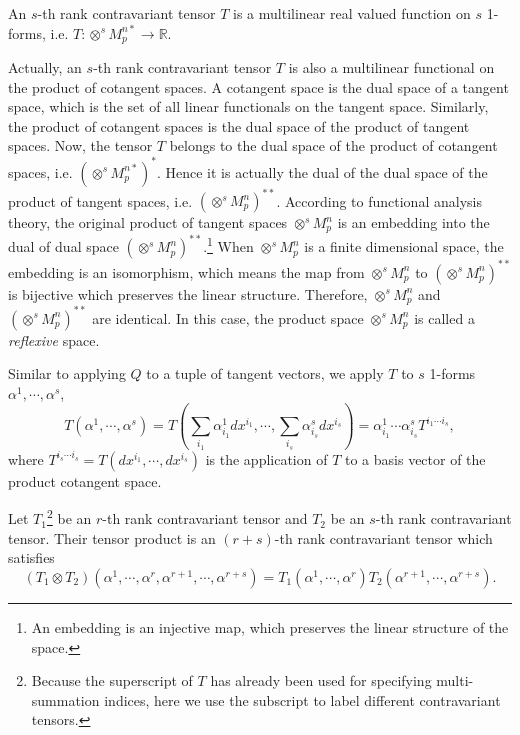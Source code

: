 \documentclass[11pt, a4paper]{book}
\begin{document}
\begin{Definition}
  An $s$-th rank contravariant tensor $T$ is a multilinear real valued function on $s$
  1-forms, i.e. $T: \otimes^s M_p^{n*} \rightarrow \mathbb{R}$.
\end{Definition}
Actually, an $s$-th rank contravariant tensor $T$ is also a multilinear functional on the
product of cotangent spaces. A cotangent space is the dual space of a tangent space, which
is the set of all linear functionals on the tangent space. Similarly, the product of
cotangent spaces is the dual space of the product of tangent spaces. Now, the tensor $T$
belongs to the dual space of the product of cotangent spaces, i.e.
$\left( \otimes^s M_p^{n*} \right)^{*}$. Hence it is actually the dual of the dual space
of the product of tangent spaces, i.e. $\left( \otimes^s M_p^n \right)^{**}$. According to
functional analysis theory, the original product of tangent spaces $\otimes^s M_p^n$ is an
embedding into the dual of dual space $\left( \otimes^s M_p^n \right)^{**}$.\footnote{An
  embedding is an injective map, which preserves the linear structure of the space.} When
$\otimes^s M_p^n$ is a finite dimensional space, the embedding is an isomorphism, which
means the map from $\otimes^s M_p^n$ to $\left( \otimes^s M_p^n \right)^{**}$ is bijective
which preserves the linear structure. Therefore, $\otimes^s M_p^n$ and
$\left( \otimes^s M_p^n \right)^{**}$ are identical. In this case, the product space
$\otimes^s M_p^n$ is called a \emph{reflexive} space.

Similar to applying $Q$ to a tuple of tangent vectors, we apply $T$ to $s$ 1-forms
$\alpha^1,\cdots,\alpha^s$,
\begin{equation}
  \label{eq:contravariant-tensor-applied-to-s-1-forms}
  T(\alpha^1,\cdots,\alpha^s) = T(\sum_{i_1}\alpha_{i_1}^1 dx^{i_1}, \cdots,
  \sum_{i_s}\alpha_{i_s}^s dx^{i_s}) = \alpha_{i_1}^1\cdots\alpha_{i_s}^s T^{i_1 \cdots i_s},
\end{equation}
where $T^{i_s\cdots i_s} = T(dx^{i_1},\cdots,dx^{i_s})$ is the application of $T$ to a basis vector of the product
cotangent space.

\begin{Definition}
  Let $T_1$\footnote{Because the superscript of $T$ has already been used for specifying
    multi-summation indices, here we use the subscript to label different contravariant
    tensors.} be an $r$-th rank contravariant tensor and $T_2$ be an $s$-th rank
  contravariant tensor. Their tensor product is an $(r+s)$-th rank contravariant tensor
  which satisfies
  \begin{equation}
    \label{eq:tensor-product-of-contravariant-tensors}
    \left( T_1 \otimes T_2
    \right)(\alpha^1,\cdots,\alpha^r,\alpha^{r+1},\cdots,\alpha^{r+s}) =
    T_1(\alpha^1,\cdots,\alpha^r) T_2(\alpha^{r+1},\cdots,\alpha^{r+s}).
  \end{equation}
\end{Definition}
\end{document}
